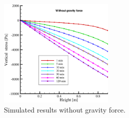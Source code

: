 \begin{figure}[!t]
\begin{center}
\includegraphics[width=0.49\textwidth]{chapter_14/figures/fig_14_2_13_d}
\end{center}
\caption{Simulated results without gravity force.}
\label{fig_HM_sat_nog}
\end{figure}


